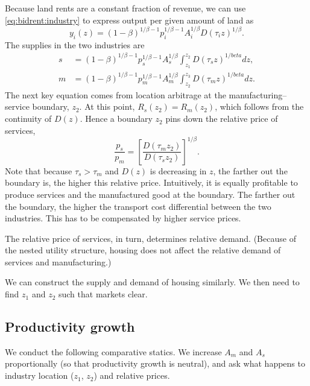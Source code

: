\documentclass[12pt]{article}
\begin{document}
Because land rents are a constant fraction of revenue, we can use \eqref{eq:bidrent:industry} to express output per given amount of land as
\[
y_i(z) = (1-\beta)^{1/\beta-1} p_i^{1/\beta-1} A_i^{1/\beta} D(\tau_i z)^{1/\beta}.
\]
The supplies in the two industries are
\begin{align*}
s &= (1-\beta)^{1/\beta-1} p_s^{1/\beta-1} A_s^{1/\beta} \int_{z_1}^{z_2}D(\tau_s z)^{1/beta} dz, \\
m&= (1-\beta)^{1/\beta-1} p_m^{1/\beta-1} A_m^{1/\beta} \int_{z_2}^{z_3}D(\tau_m z)^{1/beta} dz.
\end{align*}
The next key equation comes from location arbitrage at the manufacturing--service boundary, $z_2$. At this point, $R_s(z_2)=R_m(z_2)$, which follows from the continuity of $D(z)$. Hence a boundary $z_2$ pins down the relative price of services,
\begin{equation}\label{eq:arbitrage}
\frac{p_s}{p_m} = \left[\frac{D(\tau_m z_2)}{D(\tau_s z_2)}\right]^{1/\beta}.
\end{equation}
Note that because $\tau_s>\tau_m$ and $D(z)$ is decreasing in $z$, the farther out the boundary is, the higher this relative price. Intuitively, it is equally profitable to produce services and the manufactured good at the boundary. The farther out the boundary, the higher the transport cost differential between the two industries. This has to be compensated by higher service prices.

The relative price of services, in turn, determines relative demand. (Because of the nested utility structure, housing does not affect the relative demand of services and manufacturing.)

We can construct the supply and demand of housing similarly. We then need to find $z_1$ and $z_2$ such that markets clear.

\subsection{Productivity growth}
We conduct the following comparative statics. We increase $A_m$ and $A_s$ proportionally (so that productivity growth is neutral), and ask what happens to industry location ($z_1$, $z_2$) and relative prices.
\end{document}
